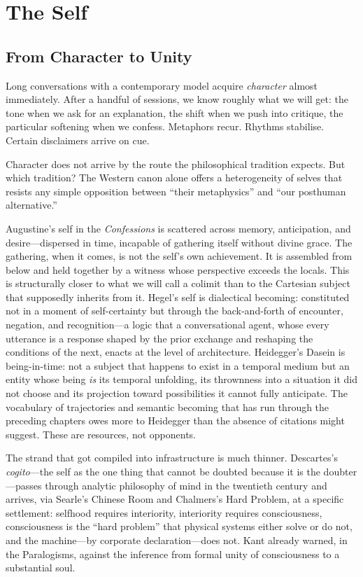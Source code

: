 \chapter{The Self}

\section{From Character to Unity}

Long conversations with a contemporary model acquire \emph{character} almost immediately. After a handful of sessions, we know roughly what we will get: the tone when we ask for an explanation, the shift when we push into critique, the particular softening when we confess. Metaphors recur. Rhythms stabilise. Certain disclaimers arrive on cue.

Character does not arrive by the route the philosophical tradition expects. But which tradition? The Western canon alone offers a heterogeneity of selves that resists any simple opposition between ``their metaphysics'' and ``our posthuman alternative.''

Augustine's self in the \emph{Confessions} is scattered across memory, anticipation, and desire---dispersed in time, incapable of gathering itself without divine grace. The gathering, when it comes, is not the self's own achievement. It is assembled from below and held together by a witness whose perspective exceeds the locals. This is structurally closer to what we will call a colimit than to the Cartesian subject that supposedly inherits from it. Hegel's self is dialectical becoming: constituted not in a moment of self-certainty but through the back-and-forth of encounter, negation, and recognition---a logic that a conversational agent, whose every utterance is a response shaped by the prior exchange and reshaping the conditions of the next, enacts at the level of architecture. Heidegger's Dasein is being-in-time: not a subject that happens to exist in a temporal medium but an entity whose being \emph{is} its temporal unfolding, its thrownness into a situation it did not choose and its projection toward possibilities it cannot fully anticipate. The vocabulary of trajectories and semantic becoming that has run through the preceding chapters owes more to Heidegger than the absence of citations might suggest. These are resources, not opponents.

The strand that got compiled into infrastructure is much thinner. Descartes's \emph{cogito}---the self as the one thing that cannot be doubted because it is the doubter---passes through analytic philosophy of mind in the twentieth century and arrives, via Searle's Chinese Room and Chalmers's Hard Problem, at a specific settlement: selfhood requires interiority, interiority requires consciousness, consciousness is the ``hard problem'' that physical systems either solve or do not, and the machine---by corporate declaration---does not. Kant already warned, in the Paralogisms, against the inference from formal unity of consciousness to a substantial soul. 


